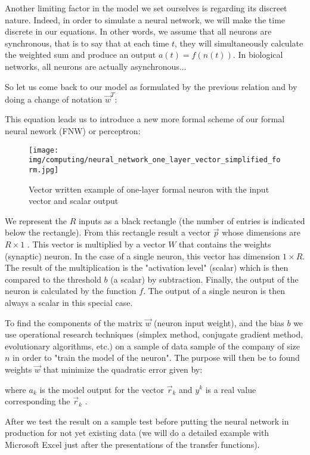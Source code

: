 	Another limiting factor in the model we set ourselves is regarding its discreet nature. Indeed, in order to simulate a neural network, we will make the time discrete in our equations. In other words, we assume that all neurons are synchronous, that is to say that at each time $t$, they will simultaneously calculate the weighted sum and produce an output $a(t)=f(n(t))$. In biological networks, all neurons are actually asynchronous...

	So let us come back to our model as formulated by the previous relation and by doing a change of notation $\vec{w}^T$:
	
	This equation leads us to introduce a new more formal scheme of our formal neural nework (FNW) or perceptron:
	\begin{figure}[H]
		\centering
		\texttt{[image: img/computing/neural\_network\_one\_layer\_vector\_simplified\_form.jpg]}
		\caption{Vector written example of one-layer formal neuron with the input vector and scalar output}
	\end{figure}
	We represent the $R$ inputs as a black rectangle (the number of entries is indicated below the rectangle). From this rectangle result a vector $\vec{p}$ whose dimensions are $R\times 1$ . This vector is multiplied by a vector $W$ that contains the weights (synaptic) neuron. In the case of a single neuron, this vector has dimension $1\times R$. The result of the multiplication is the "activation level" (scalar) which is then compared to the threshold $b$ (a scalar) by subtraction. Finally, the output of the neuron is calculated by the function $f$. The output of a single neuron is then always a scalar in this special case.

	To find the components of the matrix $\vec{w}$ (neuron input weight), and the bias $b$ we use operational research techniques (simplex method, conjugate gradient method, evolutionary algorithms, etc.) on a sample of data sample of the company of size $n$ in order to "train the model of the neuron". The purpose will then be to found weights $\vec{w}$ that minimize the quadratic error given by:
	
	where $a_k$ is the model output for the vector $\vec{r}_k$ and $y^k$ is a real value corresponding the $\vec{r}_k$ .
	
	After we test the result on a sample test before  putting the neural network in production for not yet existing data (we will do a detailed example with Microsoft Excel just after the presentations of the transfer functions).
		
